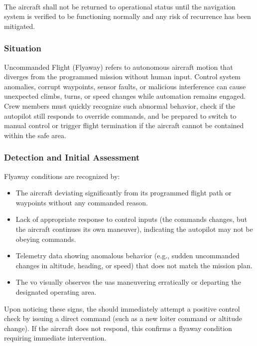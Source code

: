                 \paragraph{} The aircraft shall not be returned to operational status until the navigation system is verified to be functioning normally and any risk of recurrence has been mitigated.

        
            \subsubsection{Situation}Uncommanded Flight (Flyaway) refers to autonomous aircraft motion that diverges from the programmed mission without human input. Control system anomalies, corrupt waypoints, sensor faults, or malicious interference can cause unexpected climbs, turns, or speed changes while automation remains engaged. 
Crew members must quickly recognize such abnormal behavior, check if the autopilot still responds to override commands, and be prepared to switch to manual control or trigger flight termination if the aircraft cannot be contained within the safe area.
 
            \subsubsection{Detection and Initial Assessment} Flyaway conditions are recognized by:
            \begin{itemize}
                \item The aircraft deviating significantly from its programmed flight path or waypoints without any commanded reason.
                \item Lack of appropriate response to control inputs (the  commands changes, but the aircraft continues its own maneuver), indicating the autopilot may not be obeying commands.
                \item Telemetry data showing anomalous behavior (e.g., sudden uncommanded changes in altitude, heading, or speed) that does not match the mission plan.
                \item The \ac{vo} visually observes the \ac{uas} maneuvering erratically or departing the designated operating area.
            \end{itemize}
            Upon noticing these signs, the  should immediately attempt a positive control check by issuing a direct command (such as a new loiter command or altitude change). If the aircraft does not respond, this confirms a flyaway condition requiring immediate intervention.
 
